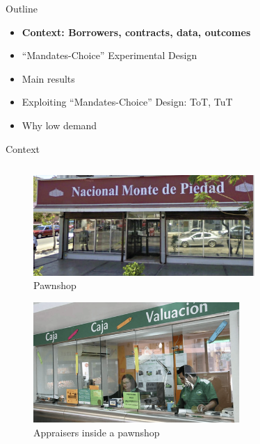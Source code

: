 \documentclass[9pt, aspectratio=169]{beamer}
\begin{document}
\begin{frame}{Outline}
     \large   
     \begin{itemize}
        \item \textbf{Context: Borrowers, contracts, data, outcomes}
         \item \vfill ``Mandates-Choice'' Experimental Design
         \vfill\item Main results
          \vfill\item Exploiting ``Mandates-Choice'' Design: ToT, TuT
         \vfill\item Why low demand
     \end{itemize}
\end{frame}


\begin{frame}{Context}
\vspace{-.4in}
\begin{columns}
\begin{column}{.45\textwidth}
\begin{figure}[H]
    \begin{center}
    \caption{Pawnshop}
        \includegraphics[width=0.75\textwidth]{Figuras/empenio2_.png}
    \end{center}
    \end{figure}
\begin{figure}[H]
    \begin{center}
    \caption{Appraisers  inside a pawnshop}
        \includegraphics[width=0.7\textwidth]{Figuras/empenio9_.png}

\end{center}
\end{figure}
\end{column}
\end{columns}
\end{frame}
\end{document}
